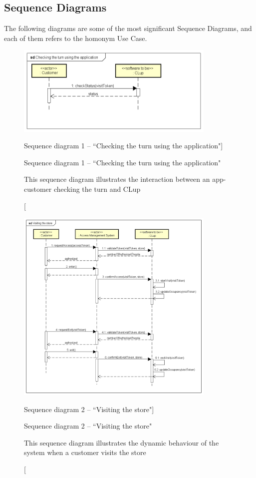 \documentclass[a4paper,oneside,11pt]{book}   %
\newcommand{\captionrasd}[2]{\caption[#1]{#1 \par \small #2}}
\begin{document}
    \subsection{Sequence Diagrams}
    The following diagrams are some of the most significant Sequence Diagrams, and each of them refers to the homonym Use Case. 
    
    \begin{figure}[H]
        \centering
        \includegraphics[width=0.85\textwidth, keepaspectratio]{pictures/sequence_diagrams/check_turn_via_app}
        \captionrasd{Sequence diagram 1 -- ``Checking the turn using the application"}{This sequence diagram illustrates the interaction between an app-customer checking the turn and CLup}
        \label{figure:sequence_diagram_1_check_turn_via_app}
    \end{figure}
    
    \begin{figure}[H]
        \centering
        \includegraphics[width=0.85\textwidth, keepaspectratio]{pictures/sequence_diagrams/visiting_the_store}
        \captionrasd{Sequence diagram 2 -- ``Visiting the store"}{This sequence diagram illustrates the dynamic behaviour of the system when a customer visits the store}
        \label{figure:sequence_diagram_2_visiting_store_app}
    \end{figure}
    
\end{document}
